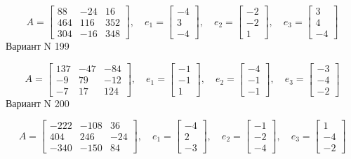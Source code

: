 \documentclass[11pt]{report}
\begin{document}
$$A = \left[\begin{matrix}88 & -24 & 16\\464 & 116 & 352\\304 & -16 & 348\end{matrix}\right],\quad e_1 = \left[\begin{matrix}-4\\3\\-4\end{matrix}\right],\quad e_2 = \left[\begin{matrix}-2\\-2\\1\end{matrix}\right],\quad e_3 = \left[\begin{matrix}3\\4\\-4\end{matrix}\right]$$Вариант N 199

$$A = \left[\begin{matrix}137 & -47 & -84\\-9 & 79 & -12\\-7 & 17 & 124\end{matrix}\right],\quad e_1 = \left[\begin{matrix}-1\\-1\\1\end{matrix}\right],\quad e_2 = \left[\begin{matrix}-4\\-1\\-1\end{matrix}\right],\quad e_3 = \left[\begin{matrix}-3\\-4\\-2\end{matrix}\right]$$Вариант N 200

$$A = \left[\begin{matrix}-222 & -108 & 36\\404 & 246 & -24\\-340 & -150 & 84\end{matrix}\right],\quad e_1 = \left[\begin{matrix}-4\\2\\-3\end{matrix}\right],\quad e_2 = \left[\begin{matrix}-1\\-2\\-4\end{matrix}\right],\quad e_3 = \left[\begin{matrix}1\\-4\\-2\end{matrix}\right]$$
\end{document}
